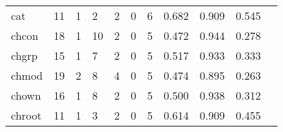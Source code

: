 \begin{longtable}{lp{1.20cm}p{1.20cm}p{1.20cm}p{1.20cm}p{1.20cm}p{1.20cm}p{1.20cm}p{1.20cm}p{1.20cm}p{1.20cm}}
cat       &                                    11 &                                                  1 &                                                  2 &                                                  2 &                                                  0 &                                                  6 &                                         0.682 &                                              0.909 &                                              0.545 \\
chcon     &                                    18 &                                                  1 &                                                 10 &                                                  2 &                                                  0 &                                                  5 &                                         0.472 &                                              0.944 &                                              0.278 \\
chgrp     &                                    15 &                                                  1 &                                                  7 &                                                  2 &                                                  0 &                                                  5 &                                         0.517 &                                              0.933 &                                              0.333 \\
chmod     &                                    19 &                                                  2 &                                                  8 &                                                  4 &                                                  0 &                                                  5 &                                         0.474 &                                              0.895 &                                              0.263 \\
chown     &                                    16 &                                                  1 &                                                  8 &                                                  2 &                                                  0 &                                                  5 &                                         0.500 &                                              0.938 &                                              0.312 \\
chroot    &                                    11 &                                                  1 &                                                  3 &                                                  2 &                                                  0 &                                                  5 &                                         0.614 &                                              0.909 &                                              0.455 \\

\end{longtable}
